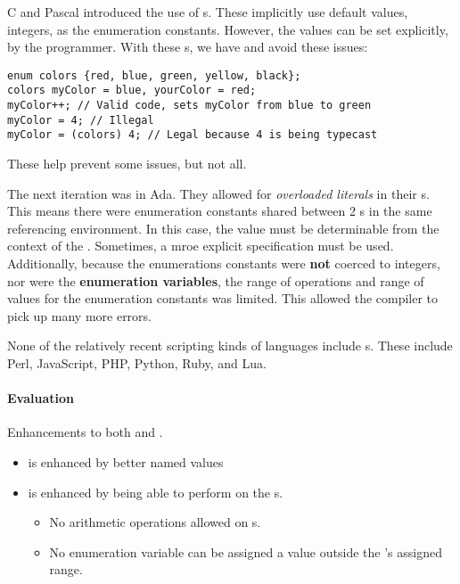 C and Pascal introduced the use of s.
These implicitly use default values, integers, as the enumeration constants.
However, the values can be set explicitly, by the programmer.
With these s, we have and avoid these issues:
\begin{verbatim}
enum colors {red, blue, green, yellow, black};
colors myColor = blue, yourColor = red;
myColor++; // Valid code, sets myColor from blue to green
myColor = 4; // Illegal
myColor = (colors) 4; // Legal because 4 is being typecast
\end{verbatim}

These help prevent some issues, but not all.

The next iteration was in Ada.
They allowed for \emph{overloaded literals} in their s.
This means there were enumeration constants shared between 2 s in the same referencing environment.
In this case, the value must be determinable from the context of the .
Sometimes, a mroe explicit specification must be used.
Additionally, because the enumerations constants were \textbf{not} coerced to integers, nor were the \textbf{enumeration variables}, the range of operations and range of values for the enumeration constants was limited.
This allowed the compiler to pick up many more errors.

\begin{remark*}
  None of the relatively recent scripting kinds of languages include s.
  These include Perl, JavaScript, PHP, Python, Ruby, and Lua.
\end{remark*}

\paragraph{Evaluation}\label{par:Enumeration_Types_Evaluation}
Enhancements to both  and .
\begin{itemize}[noitemsep]
\item {} is enhanced by better named values
\item {} is enhanced by being able to perform  on the s.
  \begin{itemize}[noitemsep]
  \item No arithmetic operations allowed on s.
  \item No enumeration variable can be assigned a value outside the 's assigned range.
  \end{itemize}
\end{itemize}

